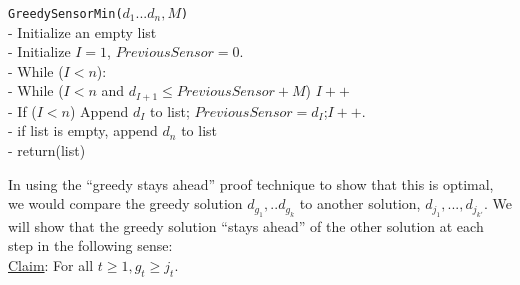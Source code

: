\documentclass{exam}
\begin{document}
\begin{questions}
\begin{framed}
{\tt GreedySensorMin($d_1...d_n, M$)}\\
\hspace*{0.1in} - Initialize an empty list\\
\hspace*{0.1in} - Initialize $I=1$, $PreviousSensor=0$.\\
\hspace*{0.1in} - While ($I < n$):\\
\hspace*{0.4in} - While ($I < n$ and $d_{I+1} \le PreviousSensor+ M$) $I++$\\
\hspace*{0.4in} - If ($I< n$) Append $d_I$ to list; $PreviousSensor=d_I$;$I++$. \\
\hspace*{0.1in} - if list is empty, append $d_n$ to list\\
\hspace*{0.1in} - return(list)
\end{framed}

In using the ``greedy stays ahead'' proof technique to show that
this is optimal, we would compare the greedy solution $d_{g_1},..d_{g_k}$ to another solution, $d_{j_1},..., d_{j_{k'}}$.
We will show that the greedy solution ``stays ahead'' of the other solution at each step in the following sense:\\
\underline{Claim}: For all $t \geq 1, g_t \geq j_t$.

\end{questions}
\end{document}
